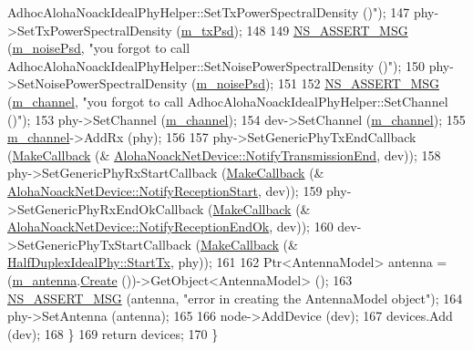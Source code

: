 \begin{DoxyCode}
{       AdhocAlohaNoackIdealPhyHelper::SetTxPowerSpectralDensity ()"});
147       phy->SetTxPowerSpectralDensity (\hyperlink{classns3_1_1AdhocAlohaNoackIdealPhyHelper_a684be03c1600fd53054a8654aa3c516b}{m\_txPsd});
148 
149       \hyperlink{assert_8h_aff5ece9066c74e681e74999856f08539}{NS\_ASSERT\_MSG} (\hyperlink{classns3_1_1AdhocAlohaNoackIdealPhyHelper_a5452e6ebea4ea0d8a60ab4ed3d785a39}{m\_noisePsd}, \textcolor{stringliteral}{"you forgot to call
       AdhocAlohaNoackIdealPhyHelper::SetNoisePowerSpectralDensity ()"});
150       phy->SetNoisePowerSpectralDensity (\hyperlink{classns3_1_1AdhocAlohaNoackIdealPhyHelper_a5452e6ebea4ea0d8a60ab4ed3d785a39}{m\_noisePsd});
151 
152       \hyperlink{assert_8h_aff5ece9066c74e681e74999856f08539}{NS\_ASSERT\_MSG} (\hyperlink{classns3_1_1AdhocAlohaNoackIdealPhyHelper_a3cd17acf9ec7f241a773ecf15482f128}{m\_channel}, \textcolor{stringliteral}{"you forgot to call
       AdhocAlohaNoackIdealPhyHelper::SetChannel ()"});
153       phy->SetChannel (\hyperlink{classns3_1_1AdhocAlohaNoackIdealPhyHelper_a3cd17acf9ec7f241a773ecf15482f128}{m\_channel});
154       dev->SetChannel (\hyperlink{classns3_1_1AdhocAlohaNoackIdealPhyHelper_a3cd17acf9ec7f241a773ecf15482f128}{m\_channel});
155       \hyperlink{classns3_1_1AdhocAlohaNoackIdealPhyHelper_a3cd17acf9ec7f241a773ecf15482f128}{m\_channel}->AddRx (phy);
156 
157       phy->SetGenericPhyTxEndCallback   (\hyperlink{group__makecallbackmemptr_ga9376283685aa99d204048d6a4b7610a4}{MakeCallback} (&
      \hyperlink{classns3_1_1AlohaNoackNetDevice_a7fcff6bdf5cf11f81d22c2ee9e1b1745}{AlohaNoackNetDevice::NotifyTransmissionEnd}, dev));
158       phy->SetGenericPhyRxStartCallback (\hyperlink{group__makecallbackmemptr_ga9376283685aa99d204048d6a4b7610a4}{MakeCallback} (&
      \hyperlink{classns3_1_1AlohaNoackNetDevice_a356254832ab880114c98f939f26843a9}{AlohaNoackNetDevice::NotifyReceptionStart}, dev));
159       phy->SetGenericPhyRxEndOkCallback (\hyperlink{group__makecallbackmemptr_ga9376283685aa99d204048d6a4b7610a4}{MakeCallback} (&
      \hyperlink{classns3_1_1AlohaNoackNetDevice_ad2a4bfeb92d6ad91a5d5c07918902f58}{AlohaNoackNetDevice::NotifyReceptionEndOk}, dev));
160       dev->SetGenericPhyTxStartCallback (\hyperlink{group__makecallbackmemptr_ga9376283685aa99d204048d6a4b7610a4}{MakeCallback} (&
      \hyperlink{classns3_1_1HalfDuplexIdealPhy_ae5cc5d9c4faab8c4119c7f9a5a631cca}{HalfDuplexIdealPhy::StartTx}, phy));
161 
162       Ptr<AntennaModel> antenna = (\hyperlink{classns3_1_1AdhocAlohaNoackIdealPhyHelper_a932538c358299d313ca1b15348df6ea0}{m\_antenna}.\hyperlink{classns3_1_1ObjectFactory_a18152e93f0a6fe184ed7300cb31e9896}{Create} ())->GetObject<AntennaModel> ();
163       \hyperlink{assert_8h_aff5ece9066c74e681e74999856f08539}{NS\_ASSERT\_MSG} (antenna, \textcolor{stringliteral}{"error in creating the AntennaModel object"});
164       phy->SetAntenna (antenna);
165 
166       node->AddDevice (dev);
167       devices.Add (dev);
168     \}
169   \textcolor{keywordflow}{return} devices;
170 \}
\end{DoxyCode}


